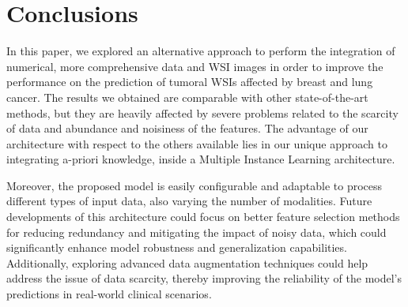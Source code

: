 \documentclass[10pt,twocolumn]{article}
\begin{document}
\section{Conclusions} \label{conclusions}






In this paper, we explored an alternative approach to perform the integration of numerical, more comprehensive data and WSI images in order to improve the performance on the prediction of tumoral WSIs affected by breast and lung cancer. The results we obtained are comparable with other state-of-the-art methods, but they are heavily affected by severe problems related to the scarcity of data and abundance and noisiness of the features. The advantage of our architecture with respect to the others available lies in our unique approach to integrating a-priori knowledge, inside a Multiple Instance Learning architecture.

Moreover, the proposed model is easily configurable and adaptable to process different types of input data, also varying the number of modalities. Future developments of this architecture could focus on better feature selection methods for reducing redundancy and mitigating the impact of noisy data, which could significantly enhance model robustness and generalization capabilities. Additionally, exploring advanced data augmentation techniques could help address the issue of data scarcity, thereby improving the reliability of the model's predictions in real-world clinical scenarios.
\end{document}
